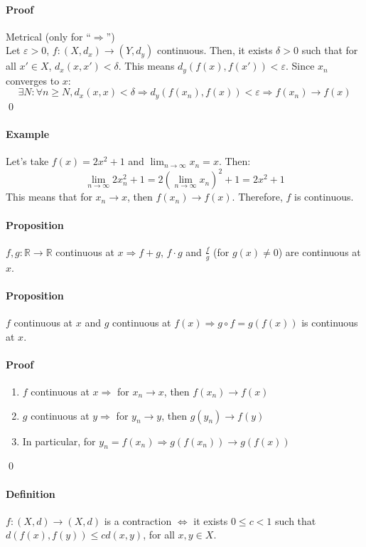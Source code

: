 \documentclass{article}
\newcommand{\DS}{\displaystyle}
\newcommand{\func}[3]{#1 : #2 \rightarrow #3}
\newcommand{\funcR}[1]{#1 : \mathbb{R} \rightarrow \mathbb{R}}
\newcommand{\limn}{\lim_{n \to \infty}}
\newcommand{\Ep}{\varepsilon}
\newcommand{\Def}{\paragraph{Definition}}
\newcommand{\Proposition}{\paragraph{Proposition}}
\newcommand{\Proof}{\paragraph{Proof}}
\newcommand{\Example}{\paragraph{Example}}
\begin{document}
	\Proof Metrical (only for ``$\Rightarrow$'')
\\Let $\Ep > 0$, $\func{f}{(X,d_x)}{(Y,d_y)}$ continuous. Then, it exists
	$\delta > 0$ such that for all $x' \in X$, $d_x(x,x') < \delta$. This means
	$d_y(f(x),f(x')) < \Ep$. Since $x_n$ converges to $x$:
	\begin{equation*}
		\exists N : \forall n \geq N, d_x(x,x) < \delta \Rightarrow d_y(f(x_n),f(x))
		< \Ep \Rightarrow f(x_n) \to f(x)
	\end{equation*}
	\qed

	\Example Let's take $f(x) = 2x^2 + 1$ and $\DS \limn x_n = x$. Then:
	\begin{equation*}
		\limn 2x_n^2 + 1 = 2 \left(\limn x_n\right)^2 + 1 = 2x^2 + 1
	\end{equation*}
	This means that for $x_n \to x$, then $f(x_n) \to f(x)$. Therefore, $f$ is
	continuous.

	\Proposition $\funcR{f,g}$ continuous at $x \Rightarrow f+g$, $f \cdot g$ and
	$\frac{f}{g}$ (for $g(x) \neq 0$) are continuous at $x$.

	\Proposition $f$ continuous at $x$ and $g$ continuous at $f(x) \Rightarrow
	g \circ f = g(f(x))$ is continuous at $x$.

	\Proof
	\begin{enumerate}[label=(\arabic*)]
		\item $f$ continuous at $x \Rightarrow$ for $x_n \to x$, then $f(x_n) \to f(x)$
		\item $g$ continuous at $y \Rightarrow$ for $y_n \to y$, then $g(y_n) \to f(y)$
		\item In particular, for $y_n = f(x_n) \Rightarrow g(f(x_n)) \to g(f(x))$
	\end{enumerate}
	\qed

	\Def $\func{f}{(X,d)}{(X,d)}$ is a contraction $\iff$ it exists $0 \leq c < 1$
	such that $d(f(x),f(y)) \leq cd(x,y)$, for all $x,y \in X$.
\end{document}

